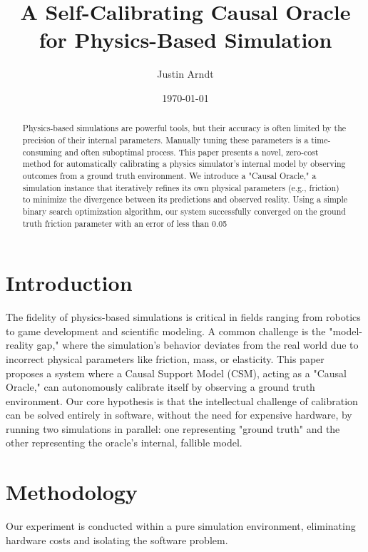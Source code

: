 \documentclass{article}
\title{A Self-Calibrating Causal Oracle for Physics-Based Simulation}
\author{Justin Arndt}
\date{\today}
\begin{document}
\maketitle

\begin{abstract}
Physics-based simulations are powerful tools, but their accuracy is often limited by the precision of their internal parameters. Manually tuning these parameters is a time-consuming and often suboptimal process. This paper presents a novel, zero-cost method for automatically calibrating a physics simulator's internal model by observing outcomes from a ground truth environment. We introduce a "Causal Oracle," a simulation instance that iteratively refines its own physical parameters (e.g., friction) to minimize the divergence between its predictions and observed reality. Using a simple binary search optimization algorithm, our system successfully converged on the ground truth friction parameter with an error of less than 0.05%
\end{abstract}

\section{Introduction}
The fidelity of physics-based simulations is critical in fields ranging from robotics to game development and scientific modeling. A common challenge is the "model-reality gap," where the simulation's behavior deviates from the real world due to incorrect physical parameters like friction, mass, or elasticity. This paper proposes a system where a Causal Support Model (CSM), acting as a "Causal Oracle," can autonomously calibrate itself by observing a ground truth environment. Our core hypothesis is that the intellectual challenge of calibration can be solved entirely in software, without the need for expensive hardware, by running two simulations in parallel: one representing "ground truth" and the other representing the oracle's internal, fallible model.

\section{Methodology}
Our experiment is conducted within a pure simulation environment, eliminating hardware costs and isolating the software problem.
\end{document}
